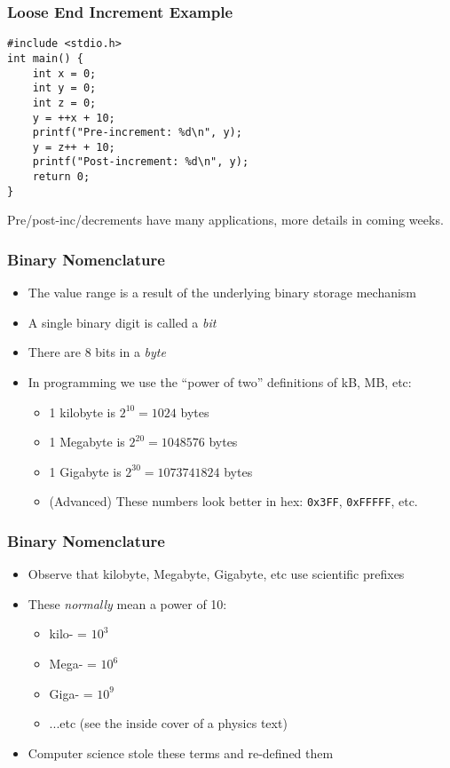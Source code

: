 \documentclass[14pt]{beamer}
\begin{document}
\begin{frame}[fragile]
\frametitle{Loose End Increment Example}
\begin{lstlisting}[style=CStyle,caption=\texttt{increment.c}]
#include <stdio.h>
int main() {
	int x = 0;
	int y = 0;
	int z = 0;
	y = ++x + 10;
	printf("Pre-increment: %d\n", y);
	y = z++ + 10;
	printf("Post-increment: %d\n", y);
	return 0;
}
\end{lstlisting}
Pre/post-inc/decrements have many applications, more details in coming weeks.
\end{frame}

\begin{frame}
\frametitle{Binary Nomenclature}
\begin{itemize}
\item The value range is a result of the underlying binary storage mechanism
\item A single binary digit is called a \textit{bit}
\item There are 8 bits in a \textit{byte}
\item In programming we use the ``power of two'' definitions of kB, MB, etc:
	\begin{itemize}
		\item 1 kilobyte is $2^{10} = 1024$ bytes
		\item 1 Megabyte is $2^{20} = 1048576$ bytes
		\item 1 Gigabyte is $2^{30} = 1073741824$ bytes
		\item (Advanced) These numbers look better in hex: \texttt{0x3FF}, \texttt{0xFFFFF}, etc.
	\end{itemize}
\end{itemize}
\end{frame}

\begin{frame}
\frametitle{Binary Nomenclature}
\begin{itemize}
\item Observe that kilobyte, Megabyte, Gigabyte, etc use scientific prefixes
\item These \textit{normally} mean a power of 10:
	\begin{itemize}
		\item kilo- = $10^3$
		\item Mega- = $10^6$
		\item Giga- = $10^9$
		\item ...etc (see the inside cover of a physics text)
	\end{itemize}
\item Computer science stole these terms and re-defined them

\end{itemize}
\end{frame}
\end{document}
